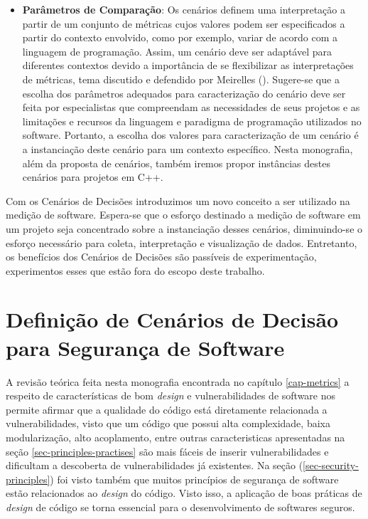 \begin{itemize}
\item \textbf{Parâmetros de Comparação}: Os cenários definem uma interpretação a partir de um conjunto de métricas cujos valores podem ser especificados a partir do contexto envolvido, como por exemplo, variar de acordo com a linguagem de programação. Assim, um cenário deve ser adaptável para diferentes contextos devido a importância de se flexibilizar as interpretações de métricas, tema discutido e defendido por Meirelles (\citeyear{meirelles2013metrics}). Sugere-se que a escolha dos parâmetros adequados para caracterização do cenário deve ser feita por especialistas que compreendam as necessidades de seus projetos e as limitações e recursos da linguagem e paradigma de programação utilizados no software. Portanto, a escolha dos valores para caracterização de um cenário é a instanciação deste cenário para um contexto específico. Nesta monografia, além da proposta de cenários, também iremos propor instâncias destes cenários para projetos em C++.
\end{itemize}

Com os Cenários de Decisões introduzimos um novo conceito a ser utilizado na medição de software. Espera-se que o esforço destinado a medição de software em um projeto seja concentrado sobre a instanciação desses cenários, diminuindo-se o esforço necessário para coleta, interpretação e visualização de dados. Entretanto, os benefícios dos Cenários de Decisões são passíveis de experimentação, experimentos esses que estão fora do escopo deste trabalho.


\section{Definição de Cenários de Decisão para Segurança de Software}
\label{cap-cenarios-sec-definicaocenarios}

A revisão teórica feita nesta monografia encontrada no capítulo \ref{cap-metrics} a respeito de características de bom \emph{design} e vulnerabilidades de software nos permite afirmar que a qualidade do código está diretamente relacionada a vulnerabilidades, visto que um código que possui alta complexidade, baixa modularização, alto acoplamento, entre outras caracteristicas apresentadas na seção \ref{sec-principles-practises} são mais fáceis de inserir vulnerabilidades e dificultam a descoberta de vulnerabilidades já existentes. Na seção (\ref{sec-security-principles}) foi visto também que muitos princípios de segurança de software estão relacionados ao \emph{design} do código. Visto isso, a aplicação de boas práticas de \emph{design} de código se torna essencial para o desenvolvimento de softwares seguros.

